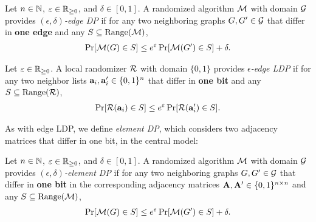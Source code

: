 \begin{definition}  \label{def:edge_DP} 
Let $n \in \mathbb{N}$, $\varepsilon \in \mathbb{R}_{\ge0}$, and $\delta \in [0,1]$. 
A randomized algorithm $\mathcal{M}$ with domain $\mathcal{G}$ provides \emph{$(\epsilon, \delta)$-edge DP} 
if for any two neighboring graphs $G, G' \in \mathcal{G}$ that differ in \textbf{one edge} and any $S \subseteq \mathrm{Range}(\mathcal{M})$, 
\begin{align*}
\Pr[\mathcal{M}(G) \in S] \leq e^\varepsilon \Pr[\mathcal{M}(G') \in S] + \delta.
\end{align*}
\end{definition}

\begin{definition}  \label{def:edge_LDP} 
Let $\varepsilon \in \mathbb{R}_{\ge0}$. 
A local randomizer $\mathcal{R}$ with domain $\{0,1\}$ provides \emph{$\epsilon$-edge LDP} if for any two neighbor lists $\mathbf{a}_i, \mathbf{a}'_i \in \{0,1\}^n$ that differ in \textbf{one bit} and any $S \subseteq \mathrm{Range}(\mathcal{R})$, 
\begin{align*}
\Pr[\mathcal{R}(\mathbf{a}_i) \in S] \leq e^\varepsilon \Pr[\mathcal{R}(\mathbf{a}'_i) \in S].
\end{align*}
\end{definition}

As with edge LDP,  
we define \textit{element DP}, which considers two adjacency matrices that differ in one bit, in the central model:

\begin{definition}  \label{def:element_DP} 
Let $n \in \mathbb{N}$, $\varepsilon \in \mathbb{R}_{\ge0}$, and $\delta \in [0,1]$. 
A randomized algorithm $\mathcal{M}$ with domain $\mathcal{G}$ provides \emph{$(\epsilon, \delta)$-element DP} 
if for any two neighboring graphs $G, G' \in \mathcal{G}$ that differ in \textbf{one bit} in the corresponding adjacency matrices $\mathbf{A}, \mathbf{A}' \in \{0,1\}^{n \times n}$
and any $S \subseteq \mathrm{Range}(\mathcal{M})$, 
\begin{align*}
\Pr[\mathcal{M}(G) \in S] \leq e^\varepsilon \Pr[\mathcal{M}(G') \in S] + \delta.
\end{align*}
\end{definition}

